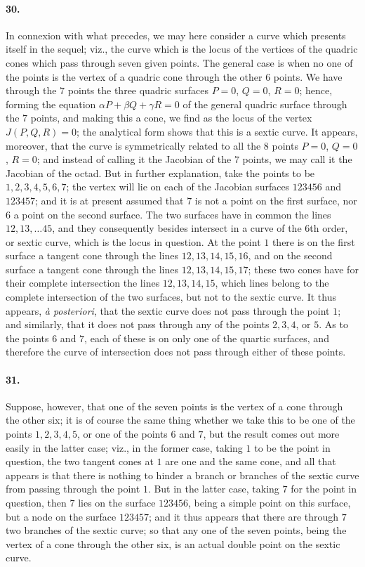 \documentclass[11pt,a4paper]{article}
\begin{document}
\paragraph{30.}
In connexion with what precedes, we may here consider a curve which presents itself in the
sequel; viz., the curve which is the locus of the vertices of the quadric cones which pass
through seven given points. The general case is when no one of the points is the vertex of
a quadric cone through the other $6$ points. We have through the $7$ points the three
quadric surfaces $P = 0$, $Q = 0$, $R = 0$; hence, forming the equation
$\alpha P + \beta Q + \gamma R = 0$ of the general quadric surface through the $7$ points,
and making this a cone, we find as the locus of the vertex $J(P, Q, R) = 0$; the analytical
form shows that this is a sextic curve. It appears, moreover, that the curve is
symmetrically related to all the $8$ points $P = 0$, $Q = 0$, $R = 0$; and instead of
calling it the Jacobian of the $7$ points, we may call it the Jacobian of the octad. But
in further explanation, take the points to be $1, 2, 3, 4, 5, 6, 7$; the vertex will lie on
each of the Jacobian surfaces $123456$ and $123457$; and it is at present assumed that $7$
is not a point on the first surface, nor $6$ a point on the second surface. The two
surfaces have in common the lines $12, 13, \ldots 45$, and they consequently besides
intersect in a curve of the $6$th order, or sextic curve, which is the locus in question.
At the point $1$ there is on the first surface a tangent cone through the lines
$12, 13, 14, 15, 16$, and on the second surface a tangent cone through the lines
$12, 13, 14, 15, 17$; these two cones have for their complete intersection the lines
$12, 13, 14, 15$, which lines belong to the complete intersection of the two surfaces, but
not to the sextic curve. It thus appears, \textit{\`a posteriori}, that the sextic curve
does not pass through the point $1$; and similarly, that it does not pass through any of
the points $2, 3, 4$, or $5$. As to the points $6$ and $7$, each of these is on only one
of the quartic surfaces, and therefore the curve of intersection does not pass through
either of these points.

\paragraph{31.}
Suppose, however, that one of the seven points is the vertex of a cone through the other
six; it is of course the same thing whether we take this to be one of the points
$1, 2, 3, 4, 5$, or one of the points $6$ and $7$, but the result comes out more easily in
the latter case; viz., in the former case, taking $1$ to be the point in question, the two
tangent cones at $1$ are one and the same cone, and all that appears is that there is
nothing to hinder a branch or branches of the sextic curve from passing through the point
$1$. But in the latter case, taking $7$ for the point in question, then $7$ lies on the
surface $123456$, being a simple point on this surface, but a node on the surface $123457$;
and it thus appears that there are through $7$ two branches of the sextic curve; so that
any one of the seven points, being the vertex of a cone through the other six, is an
actual double point on the sextic curve.
\end{document}
